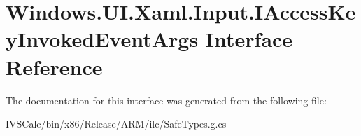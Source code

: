 \hypertarget{interface_windows_1_1_u_i_1_1_xaml_1_1_input_1_1_i_access_key_invoked_event_args}{}\section{Windows.\+U\+I.\+Xaml.\+Input.\+I\+Access\+Key\+Invoked\+Event\+Args Interface Reference}
\label{interface_windows_1_1_u_i_1_1_xaml_1_1_input_1_1_i_access_key_invoked_event_args}


The documentation for this interface was generated from the following file\+:\begin{DoxyCompactItemize}
\item 
I\+V\+S\+Calc/bin/x86/\+Release/\+A\+R\+M/ilc/Safe\+Types.\+g.\+cs\end{DoxyCompactItemize}
